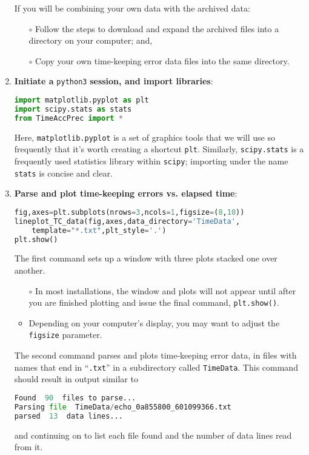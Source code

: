 \begin{enumerate}
	\smallskip
	If you will be combining your own data with the archived data:
	\begin{itemize}
		\item[$\circ$] Follow the steps to download and expand the archived files into a directory on your computer; and,
		\item[$\circ$] Copy your own time-keeping error data files into the same directory. 
	\end{itemize}
	
	\item \textbf{Initiate a } \lstinline{python3} \textbf{session, and import libraries}:
\begin{lstlisting}[language=Python]
import matplotlib.pyplot as plt
import scipy.stats as stats
from TimeAccPrec import * 
\end{lstlisting}
	Here, \lstinline{matplotlib.pyplot} is a set of graphics tools that we will use so frequently that it's worth creating a shortcut \lstinline{plt}.
	Similarly, \lstinline{scipy.stats} is a frequently used statistics library within \lstinline{scipy}; importing under the name \lstinline{stats} is concise and clear.

	\item \textbf{Parse and plot time-keeping errors vs. elapsed time}:
\begin{lstlisting}[language=Python]
fig,axes=plt.subplots(nrows=3,ncols=1,figsize=(8,10))
lineplot_TC_data(fig,axes,data_directory='TimeData',
    template="*.txt",plt_style='.')
plt.show()
\end{lstlisting}
	The first command sets up a window with three plots stacked one over another.
	\begin{itemize}
		\item[$\circ$] In most \python installations, the window and plots will not appear until after you are finished plotting and issue the final command, \lstinline{plt.show()}.
		\item[$\circ$] Depending on your computer's display, you may want to adjust the \lstinline{figsize} parameter.
	\end{itemize}
	The second command parses and plots time-keeping error data, in files with names that end in ``\lstinline{.txt}'' in a subdirectory called \lstinline{TimeData}.
	This command should result in output similar to
\begin{lstlisting}[language=Python]
Found  90  files to parse...
Parsing file  TimeData/echo_0a855800_601099366.txt
parsed  13  data lines...
\end{lstlisting}
	and continuing on to list each file found and the number of data lines read from it.
	

\end{enumerate}
